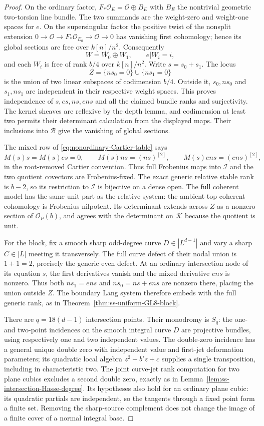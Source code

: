 \begin{proof}
On the ordinary factor,
$F_*\mathcal O_E=\mathcal O\oplus B_E$ with $B_E$ the nontrivial
geometric two-torsion line bundle. The two summands are the
weight-zero and weight-one spaces for $e$. On the supersingular
factor the positive twist of the nonsplit extension
$0\to\mathcal O\to F_*\mathcal O_{E_0}\to\mathcal O\to0$
has vanishing first cohomology; hence its global sections are
free over $k[n]/n^2$. Consequently
\[
 W=W_0\oplus W_1,\qquad e|W_i=i,
\]
and each $W_i$ is free of rank $b/4$ over $k[n]/n^2$.
Write $s=s_0+s_1$. The locus
\[
 Z=\{ns_0=0\}\cup\{ns_1=0\}
\]
is the union of two linear subspaces of codimension $b/4$.
Outside it, $s_0,ns_0$ and $s_1,ns_1$ are independent in their
respective weight spaces. This proves independence of
$s,es,ns,ens$ and all the claimed bundle ranks and surjectivity.
The kernel sheaves are reflexive by the depth lemma, and
codimension at least two permits their determinant calculation
from the displayed maps. Their inclusions into $\mathcal B$
give the vanishing of global sections.

The mixed row of \eqref{eq:nonordinary-Cartier-table} says
\[
 M(s)s=M(s)es=0,\qquad
 M(s)ns=(ns)^{[2]},\qquad M(s)ens=(ens)^{[2]},
\]
in the root-removed Cartier convention. Thus full Frobenius
maps into $\mathcal I$ and the two quotient covectors are
Frobenius-fixed. The exact generic relative stable rank is
$b-2$, so its restriction to $\mathcal I$ is bijective on a
dense open. The full coherent model has the same unit part
as the relative system: the ambient top coherent cohomology
is Frobenius-nilpotent. Its determinant extends across $Z$
as a nonzero section of $\mathcal O_P(b)$, and agrees with
the determinant on $\mathcal K$ because the quotient is unit.

For the block, fix a smooth sharp odd-degree curve
$D\in|L^{d-1}|$ and vary a sharp $C\in|L|$ meeting it
transversely. The full curve defect of their nodal union is
$1+1=2$, precisely the generic even defect. At an ordinary
intersection node of its equation $s$, the first derivatives
vanish and the mixed derivative $ens$ is nonzero. Thus both
$ns_1=ens$ and $ns_0=ns+ens$ are nonzero there, placing the
union outside $Z$. The boundary Lang system therefore embeds
with the full generic rank, as in
Theorem~\ref{thm:ss-uniform-GL8-block}.

There are $q=18(d-1)$ intersection points. Their monodromy
is $S_q$: the one- and two-point incidences on the smooth
integral curve $D$ are projective bundles, using respectively
one and two independent values. The double-zero incidence
has a general unique double zero with independent value and
first-jet deformation parameters; its quadratic local algebra
$z^2+b'z+c$ supplies a single transposition, including in
characteristic two. The joint curve-jet rank computation for
two plane cubics excludes a second double zero, exactly as in
Lemma~\ref{lem:ss-intersection-Hasse-degree}. Its hypotheses
also hold for an ordinary plane cubic: its quadratic partials
are independent, so the tangents through a fixed point form a
finite set. Removing the sharp-source complement does not
change the image of a finite cover of a normal integral base.


\end{proof}
